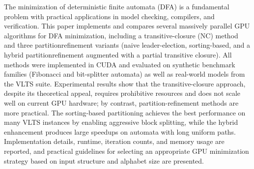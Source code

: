 The minimization of deterministic finite automata (DFA) is a fundamental problem with practical applications in model checking, compilers, and verification. This paper implements and compares several massively parallel GPU algorithms for DFA minimization, including a transitive-closure (NC) method and three partitionrefinement variants (naive leader-election, sorting-based, and a hybrid partitionrefinement augmented with a partial transitive closure). All methods were implemented in CUDA and evaluated on synthetic benchmark families (Fibonacci and bit-splitter automata) as well as real-world models from the VLTS suite. Experimental results show that the transitive-closure approach, despite its theoretical appeal, requires prohibitive resources and does not scale well on current GPU hardware; by contrast, partition-refinement methods are more practical. The sorting-based partitioning achieves the best performance on many VLTS instances by enabling aggressive block splitting, while the hybrid enhancement produces large speedups on automata with long uniform paths. Implementation details, runtime, iteration counts, and memory usage are reported, and practical guidelines for selecting an appropriate GPU minimization strategy based on input structure and alphabet size are presented.
